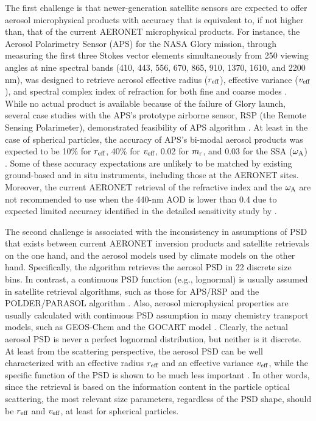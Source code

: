 The first challenge is that newer-generation satellite sensors are expected to
offer aerosol microphysical products with accuracy that is equivalent to, if
not higher than, that of the current AERONET microphysical products. For
instance, the Aerosol Polarimetry Sensor (APS) for the NASA Glory mission,
through measuring the first three Stokes vector elements simultaneously from
250 viewing angles at nine spectral bands (410, 443, 556, 670, 865, 910, 1370,
1610, and 2200 nm), was designed to retrieve aerosol effective radius ($r_\text{eff}$),
effective variance ($v_\text{eff}$), and spectral complex index of refraction for both
fine and coarse modes \citep{Mishchenko07}. While no actual product is
available because of the failure of Glory launch, several case studies with the
APS's prototype airborne sensor, RSP (the Remote Sensing Polarimeter),
demonstrated feasibility of APS algorithm \citep{Chowdhary02,Chowdhary05,
Mishchenko04,Waquet09}. At least in the case of
spherical particles, the accuracy of APS’s bi-modal aerosol products was
expected to be 10\% for $r_\text{eff}$, 40\% for $v_\text{eff}$, 0.02 for $m_\text{r}$, and 0.03 for the SSA
($\omega_\text{A}$) \citep{Mishchenko07}. Some of these accuracy expectations are
unlikely to be matched by existing ground-based and in situ instruments,
including those at the AERONET sites. Moreover, the current AERONET retrieval
of the refractive index and the $\omega_\text{A}$ are not recommended to use when the 440-nm
AOD is lower than 0.4 \citep{Holben06} due to expected limited accuracy
identified in the detailed sensitivity study by \citep{Dubovik00b}.

The second challenge is associated with the inconsistency in assumptions of PSD
that exists between current AERONET inversion products and satellite retrievals
on the one hand, and the aerosol models used by climate models on the
other hand. Specifically, the \Dub algorithm retrieves the aerosol PSD
in 22 discrete size bins. In contrast, a continuous PSD function (e.g.,
lognormal) is usually assumed in satellite retrieval algorithms, such as those
for APS/RSP \citep{Mishchenko07, Waquet09} and the
POLDER/PARASOL algorithm \citep{Hasekamp11}. Also, aerosol microphysical
properties are usually calculated with continuous PSD assumption in many
chemistry transport models, such as GEOS-Chem \citep{Drury10, Wang10}
and the GOCART model \citep{Chin02}. Clearly, the actual aerosol PSD
is never a perfect lognormal distribution, but neither is it discrete. At least
from the scattering perspective, the aerosol PSD can be well characterized with
an effective radius $r_\text{eff}$ and an effective variance $v_\text{eff}$, while the specific
function of the PSD is shown to be much less important \citep{Hansen74}.
In other words, since the retrieval is based on the information content
in the particle optical scattering, the most relevant size parameters,
regardless of the PSD shape, should be $r_\text{eff}$ and $v_\text{eff}$, at least for spherical
particles.

